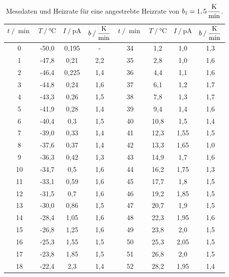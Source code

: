 \begin{table}[H]
    \centering
    \caption{Messdaten und Heizrate für eine angestrebte Heizrate von $ b_1 = 1,5 \, \unit{\dfrac{\kelvin}{\minute}}$.}
    \label{tab:Messdaten2}
    \begin{tabular}{c c c c c c c c}
    \toprule
     $t \mathbin{/} \unit{\min}$ & $T \mathbin{/} \unit{\celsius}$ & $I \mathbin{/} \unit{\pico\ampere} $&  $b \mathbin{/} \unit{\dfrac{\kelvin}{\minute}}$ & $t \mathbin{/} \unit{\min}$ & $T \mathbin{/} \unit{\celsius}$ & $I \mathbin{/} \unit{\pico\ampere} $&  $b \mathbin{/} \unit{\dfrac{\kelvin}{\minute}}$\\
    \midrule
    0   &-50,0   &0,195  &-    &  34  &1,2     &1,0    &1,3 \\  
    1   &-47,8   &0,21   &2,2  &  35  &2,8     &1,0    &1,6 \\
    2   &-46,4   &0,225  &1,4  &  36  &4,4     &1,1    &1,6 \\
    3   &-44,8   &0,24   &1,6  &  37  &6,1     &1,2    &1,7 \\
    4   &-43,3   &0,26   &1,5  &  38  &7,8     &1,3    &1,7 \\
    5   &-41,9   &0,28   &1,4  &  39  &9,4     &1,4    &1,6 \\
    6   &-40,4   &0,3    &1,5  &  40  &10,8    &1,5    &1,4 \\
    7   &-39,0   &0,33   &1,4  &  41  &12,3    &1,55   &1,5 \\
    8   &-37,6   &0,37   &1,4  &  42  &13,3    &1,65   &1,0 \\
    9   &-36,3   &0,42   &1,3  &  43  &14,9    &1,7    &1,6 \\
    10  &-34,7   &0,5    &1,6  &  44  &16,2    &1,75   &1,3 \\
    11  &-33,1   &0,59   &1,6  &  45  &17,7    &1,8    &1,5 \\
    12  &-31,5   &0,7    &1,6  &  46  &19,2    &1,85   &1,5 \\
    13  &-30,0   &0,86   &1,5  &  47  &20,7    &1,9    &1,5 \\
    14  &-28,4   &1,05   &1,6  &  48  &22,3    &1,95   &1,6 \\
    15  &-26,8   &1,25   &1,6  &  49  &23,8    &2,0    &1,5 \\    
    16  &-25,3   &1,55   &1,5  &  50  &25,3    &2,05   &1,5 \\
    17  &-23,8   &1,85   &1,5  &  51  &26,8    &2,0    &1,5 \\
    18  &-22,4   &2,3    &1,4  &  52  &28,2    &1,95   &1,4 \\

\end{tabular}
\end{table}
